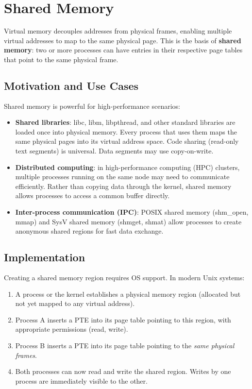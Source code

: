 \documentclass[11pt]{article}
\begin{document}
\section{Shared Memory}

Virtual memory decouples addresses from physical frames, enabling multiple virtual addresses to map to the same physical page. This is the basis of \textbf{shared memory}: two or more processes can have entries in their respective page tables that point to the same physical frame.

\subsection{Motivation and Use Cases}

Shared memory is powerful for high-performance scenarios:

\begin{itemize}
    \item \textbf{Shared libraries}: libc, libm, libpthread, and other standard libraries are loaded once into physical memory. Every process that uses them maps the same physical pages into its virtual address space. Code sharing (read-only text segments) is universal. Data segments may use copy-on-write.
    \item \textbf{Distributed computing}: in high-performance computing (HPC) clusters, multiple processes running on the same node may need to communicate efficiently. Rather than copying data through the kernel, shared memory allows processes to access a common buffer directly.
    \item \textbf{Inter-process communication (IPC)}: POSIX shared memory (shm\_open, mmap) and SysV shared memory (shmget, shmat) allow processes to create anonymous shared regions for fast data exchange.
\end{itemize}

\subsection{Implementation}

Creating a shared memory region requires OS support. In modern Unix systems:

\begin{enumerate}
    \item A process or the kernel establishes a physical memory region (allocated but not yet mapped to any virtual address).
    \item Process A inserts a PTE into its page table pointing to this region, with appropriate permissions (read, write).
    \item Process B inserts a PTE into its page table pointing to the \emph{same physical frames}.
    \item Both processes can now read and write the shared region. Writes by one process are immediately visible to the other.
\end{enumerate}
\end{document}
